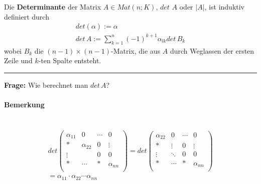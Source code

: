 \documentclass[11pt]{report}
\newcommand*\f[1] {\textbf{#1}}
\begin{document}

Die \f{Determinante} der Matrix $A \in Mat(n;K)$, $det$ $A$ oder $|A|$, ist induktiv definiert durch
\begin{align}
det(\alpha) := \alpha \\
det \, A := \sum_{k=1}^{n} (-1)^{k+1} \alpha_{lk} det\, B_k
\end{align}
wobei $B_k$ die $(n-1) \times (n-1)$-Matrix, die aus $A$ durch Weglassen der ersten Zeile und $k$-ten Spalte entsteht.\\
\vspace*{0.2cm}\rule{\linewidth}{0.3mm}\vspace{0.2cm}
\f{Frage:} Wie berechnet man $det\,A$?

\paragraph{Bemerkung} {\ \\}
\begin{align}
det\begin{pmatrix} 
\alpha_{11} & 0 & \cdots & 0 \\
* & \alpha_{22} & 0 & \vdots \\
\vdots & & 0  & 0 \\
* & \cdots & *  & \alpha_{nn} \\
\end{pmatrix} =
det\begin{pmatrix} 
\alpha_{22} & 0 & \cdots & 0 \\
* & \vdots & 0 & \vdots \\
\vdots & \ddots & 0  & 0 \\
* & \cdots & *  & \alpha_{nn} \\
\end{pmatrix} \\
= \alpha_{11} \cdot \alpha_{22} \cdots \alpha_{nn}
\end{align}
\end{document}
